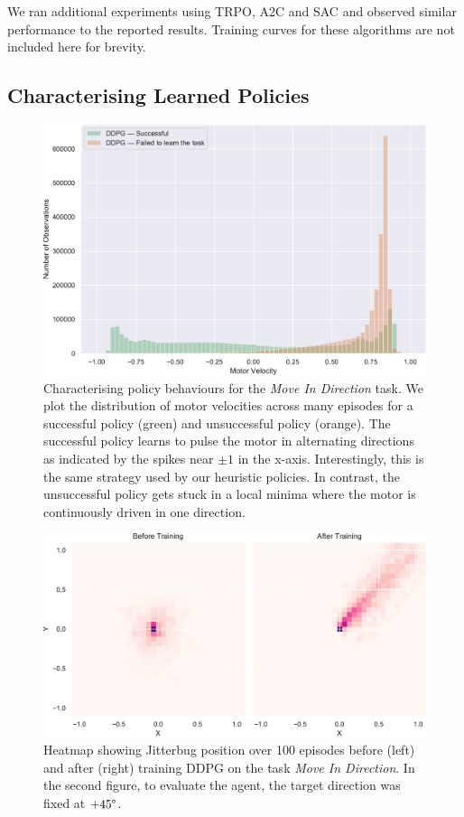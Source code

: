\documentclass[letterpaper, 10 pt, conference]{ieeeconf}
\begin{document}
We ran additional experiments using TRPO, A2C and SAC and observed similar performance to the reported results.
Training curves for these algorithms are not included here for brevity.

\subsection{Characterising Learned Policies}

\begin{figure}[t]
    \centering
    \includegraphics[width=\linewidth]{fig-motor-hist}
    \caption{
        Characterising policy behaviours for the \emph{Move In Direction} task.
        We plot the distribution of motor velocities across many episodes for a successful policy (green) and unsuccessful policy (orange).
        The successful policy learns to pulse the motor in alternating directions as indicated by the spikes near $\pm 1$ in the x-axis.
        Interestingly, this is the same strategy used by our heuristic policies.
        In contrast, the unsuccessful policy gets stuck in a local minima where the motor is continuously driven in one direction.
    }
    \label{fig:motor-hist}
\end{figure}

\begin{figure}[t]
    \centering
    \includegraphics[width=\linewidth]{fig-heatmap}
    \caption{
        Heatmap showing Jitterbug position over 100 episodes before (left) and after (right) training DDPG on the task \emph{Move In Direction}.
        In the second figure, to evaluate the agent, the target direction was fixed at $+45\degree$.
    }
    \label{fig:heatmap}
\end{figure}
\end{document}

